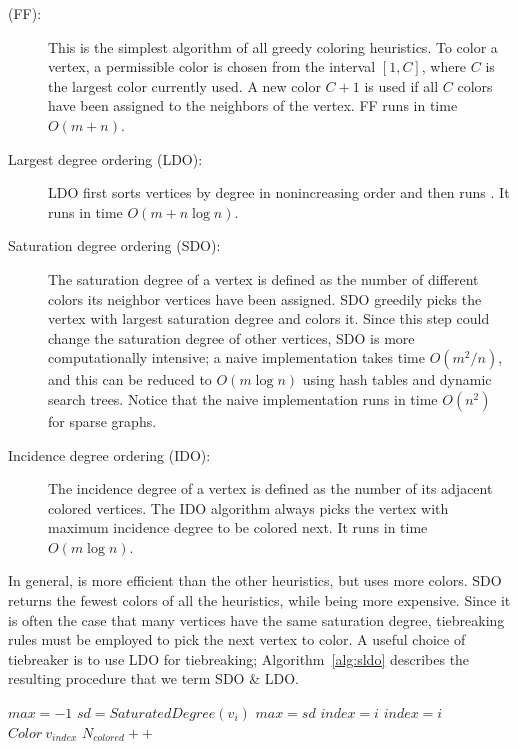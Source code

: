 \documentclass[preprint]{sigplanconf}
\newcommand{\ff}{\text{First Fit}\xspace}
\newcommand{\ffshort}{FF\xspace}
\newcommand{\ldo}{LDO\xspace}
\newcommand{\sdo}{SDO\xspace}
\newcommand{\ido}{IDO\xspace}
\newcommand{\sldo}{SDO \& LDO\xspace}
\begin{document}
\begin{description}
  \item[\ff (\ffshort):] This is the simplest algorithm of all greedy coloring heuristics\cite{klotz2002graph}. To color a vertex, a permissible color is chosen from the interval $[1,C]$, where $C$ is the largest color currently used. A new color $C+1$ is used if all  $C$ colors have been assigned to the neighbors of the vertex. \ffshort runs in time $O(m+n)$. 
  \item[Largest degree ordering (\ldo):] \ldo first sorts vertices by degree in nonincreasing order and then runs \ff. It runs in time $O(m + n\log n)$. 
\item[Saturation degree ordering (\sdo):] The saturation degree of a vertex is defined  as the number of different colors its neighbor vertices have been assigned. \sdo greedily picks the vertex with largest saturation degree and colors it. Since this step could change the saturation degree of other vertices, \sdo is more computationally intensive; a naive implementation takes time $O(m^2/n)$, and this can be reduced to $O(m\log n)$ using hash tables and dynamic search trees. Notice that the naive implementation runs in time $O(n^2)$ for sparse graphs.
\item[Incidence degree ordering (\ido):] The incidence degree of a vertex is defined as the number of its adjacent colored vertices. The \ido algorithm always picks the vertex with maximum incidence degree to be colored next. It runs in time $O(m\log n)$. 
\end{description}

In general, \ff is more efficient than the other heuristics, but uses more colors. \sdo returns the fewest colors of all the heuristics\cite{gebremedhin1999parallel}, while being more expensive. Since it is often the case that many vertices have the same saturation degree, tiebreaking rules must be employed to pick the next vertex to color. A useful choice of tiebreaker is to use \ldo for tiebreaking\cite{al2006new}; Algorithm~\ref{alg:sldo} describes the resulting procedure that we term \sldo. 

\renewcommand{\algorithmicrequire}{\textbf{phase}}
\begin{algorithm}
\caption{\sldo\label{alg:sldo}}
\begin{algorithmic}
    \STATE  $ max = -1$
           \STATE $sd = SaturatedDegree(v_i) $
               \STATE $max = sd$
               \STATE $index = i$
           \ENDIF
                 \STATE $index = i$
             \ENDIF
           \ENDIF
        \STATE $ Color \:v_{index} $
        \STATE $N_{colored} ++$
        \ENDIF
    \ENDFOR
\ENDWHILE
\end{algorithmic}
\end{algorithm}
\end{document}
